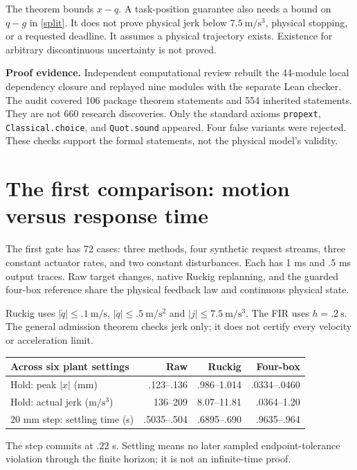 \documentclass[11pt,letterpaper]{article}
\begin{document}
The theorem bounds $x-q$. A task-position guarantee also needs a bound on $q-g$ in \eqref{split}. It does not prove physical jerk below $7.5\ \mathrm{m/s^3}$, physical stopping, or a requested deadline. It assumes a physical trajectory exists. Existence for arbitrary discontinuous uncertainty is not proved.

\textbf{Proof evidence.} Independent computational review rebuilt the 44-module local dependency closure and replayed nine modules with the separate Lean checker. The audit covered 106 package theorem statements and 554 inherited statements. They are not 660 research discoveries. Only the standard axioms \texttt{propext}, \texttt{Classical.choice}, and \texttt{Quot.sound} appeared. Four false variants were rejected. These checks support the formal statements, not the physical model's validity.

\newpage
\section{The first comparison: motion versus response time}
The first gate has 72 cases: three methods, four synthetic request streams, three constant actuator rates, and two constant disturbances. Each has 1 ms and .5 ms output traces. Raw target changes, native Ruckig replanning, and the guarded four-box reference share the physical feedback law and continuous physical state.

Ruckig uses $|\dot q|\leq.1\ \mathrm{m/s}$, $|\ddot q|\leq.5\ \mathrm{m/s^2}$ and $|j|\leq7.5\ \mathrm{m/s^3}$. The FIR uses $h=.2\ \mathrm{s}$. The general admission theorem checks jerk only; it does not certify every velocity or acceleration limit.

\begin{center}\small
\begin{tabular}{lrrr}
\toprule
Across six plant settings & Raw & Ruckig & Four-box\\
\midrule
Hold: peak $|x|$ (mm) & .123--.136 & .986--1.014 & .0334--.0460\\
Hold: actual jerk ($\mathrm{m/s^3}$) & 136--209 & 8.07--11.81 & .0364--1.20\\
20 mm step: settling time (s) & .5035--.504 & .6895--.690 & .9635--.964\\
\bottomrule
\end{tabular}
\end{center}
The step commits at $.22$ s. Settling means no later sampled endpoint-tolerance violation through the finite horizon; it is not an infinite-time proof.
\end{document}
